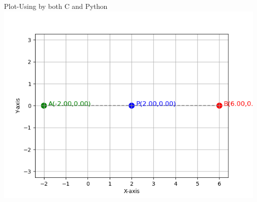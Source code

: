 \documentclass{beamer}
\begin{document}
\begin{frame}{Plot-Using by both C and Python}
    \centering
    \includegraphics[width=\columnwidth, height=0.8\textheight, keepaspectratio]{figs/fig2.1.png}     
\end{frame}
\end{document}
